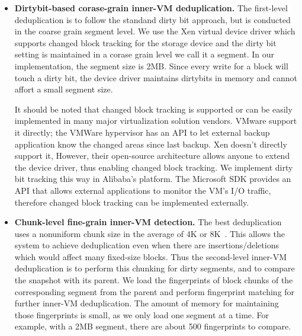 \begin{itemize}
\item \textbf{Dirtybit-based corase-grain inner-VM deduplication.}
The first-level deduplication is to follow the standand dirty bit approach, but is conducted
in the coarse grain segment level.
We use the  Xen virtual device driver which supports changed block tracking
for the storage device
and the dirty bit setting is maintained in a corase grain level we call it a segment.
In our implementation, the segment size is 2MB. 
Since every write for a block will touch a dirty bit, the device driver maintains dirtybits in memory
and cannot affort a small segment  size.

It should be noted that changed block tracking is supported or can be easily implemented in many 
major virtualization solution vendors. 
VMware support it directly; the VMWare hypervisor has an API to let external backup application know 
the changed areas since last backup. Xen doesn't directly support it, However, their open-source 
architecture allows anyone to extend the device driver, thus enabling changed block tracking. 
We implement dirty bit tracking this way in Alibaba's platform.  
The Microsoft SDK provides an API that allows external applications to monitor 
the VM's I/O traffic, therefore changed block tracking can be implemented externally. 

\item \textbf{Chunk-level fine-grain inner-VM detection.}
The best deduplication uses a nonuniform chunk size 
in the average of 4K or 8K~\cite{??}. This allows the system to
achieve deduplication even when there are insertions/deletions which would
affect many fixed-size blocks.
Thus the second-level inner-VM deduplication is to perform this chunking for
dirty segments, and to compare the snapshot with its parent. 
We load the fingerprints of block chunks of the corresponding segment from the
parent and perform fingerprint matching for further inner-VM deduplication.
The amount of memory for maintaining those fingerprints  is small, as we only
load one segment at a time.
For example, with a 2MB segment, there are about 500 fingerprints to compare.


%


\end{itemize}
